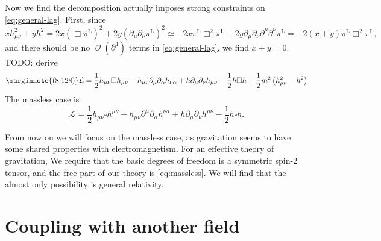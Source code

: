 \documentclass[hyperref, a4paper]{article}
\DeclareMathOperator{\bigO}{\mathcal{O}}
\begin{document}
Now we find the decomposition actually imposes strong constraints on \eqref{eq:general-lag}. First, 
since 
\[
    x h_{\mu \nu}^2 + y h^2 = 2 x (\Box \pi^\text{L})^2 + 2 y (\partial_\mu \partial_\nu \pi^\text{L})^2 \simeq 
    - 2x \pi^\text{L} \Box^2 \pi^\text{L} - 2y \partial_\mu \partial_\nu \partial^\mu \partial^\nu \pi^\text{L} 
    = - 2 (x+y) \pi^\text{L} \Box^2 \pi^\text{L},
\]
and there should be no $\bigO(\partial^4)$ terms in \eqref{eq:general-lag}, we find $x + y = 0$. 
TODO: derive 
\begin{equation} \marginnote{(8.128)}
    \mathcal{L}=\frac{1}{2} h_{\mu \nu} \square h_{\mu \nu}-h_{\mu \nu} \partial_{\mu} \partial_{\alpha} h_{\nu \alpha}+h \partial_{\mu} \partial_{\nu} h_{\mu \nu}-\frac{1}{2} h \square h+\frac{1}{2} m^{2}\left(h_{\mu \nu}^{2}-h^{2}\right)
\end{equation}
The massless case is 
\begin{equation}
    \mathcal{L}=\frac{1}{2} h_{\mu \nu} \square h^{\mu \nu}-h_{\mu \nu} \partial^{\mu} \partial_{\alpha} h^{\nu \alpha}+h \partial_{\mu} \partial_{\nu} h^{\mu \nu}-\frac{1}{2} h \square h. 
    \label{eq:massless}
\end{equation}

From now on we will focus on the massless case, as gravitation seems to have some shared properties with 
electromagnetism. For an effective theory of gravitation, We require that the basic degrees of freedom is 
a symmetric spin-2 tensor, and the free part of our theory is \eqref{eq:massless}. We will find that 
the almost only possibility is general relativity.

\section{Coupling with another field}
\end{document}
